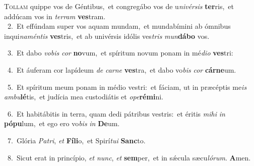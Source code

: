 \lettrine{\initial\textcolor{\initialcolor}{T}}{ollam} quippe vos de Géntibus,~\dagger et congregábo vos de u\-\textit{ni}\-\textit{vér}\textit{sis} \textbf{ter}\-ris,~\star et addúcam vos in \textit{ter}\-\textit{ram} \textbf{ves}\-tram.\\
{\numbfont\textcolor{\numbcolor}{~2.}}~Et effúndam super vos aquam mundam,~\dagger et mundabímini ab ómnibus inqui\-\textit{na}\-\textit{mén}\textit{tis} \textbf{ves}\-tris,~\star et ab univérsis idólis ves\textit{tris} \textit{mun}\-\textbf{dá}\textbf{bo} vos.\par
{\numbfont\textcolor{\numbcolor}{~3.}}~Et dabo \textit{vo}\-\textit{bis} \textit{cor} \textbf{no}\-vum,~\star et spíritum novum ponam in mé\-\textit{di}\-\textit{o} \textbf{ves}\-tri:\par
{\numbfont\textcolor{\numbcolor}{~4.}}~Et áuferam cor lapídeum \textit{de} \textit{car}\-\textit{ne} \textbf{ves}\-tra,~\star et dabo vo\textit{bis} \textit{cor} \textbf{cár}\-\textbf{ne}um.\par
{\numbfont\textcolor{\numbcolor}{~5.}}~Et spíritum meum ponam in médio vestri:~\dagger et fáciam, ut in præcéptis me\textit{is} \textit{am}\-\textit{bu}\textbf{lé}tis,~\star et judícia mea custodiátis et \textit{o}\-\textit{pe}\textbf{ré}\textbf{mi}ni.\par
{\numbfont\textcolor{\numbcolor}{~6.}}~Et habitábitis in terra, quam dedi pátribus vestris:~\dagger et éritis \textit{mi}\-\textit{hi} \textit{in} \textbf{pó}\-\textbf{pu}lum,~\star et ego ero vo\textit{bis} \textit{in} \textbf{De}\-um.\par
{\numbfont\textcolor{\numbcolor}{~7.}}~Glória \textit{Pa}\-\textit{tri}, \textit{et} \textbf{Fí}\-\textbf{li}o,~\star et Spirí\-\textit{tu}\-\textit{i} \textbf{Sanc}\-to.\par
{\numbfont\textcolor{\numbcolor}{~8.}}~Sicut erat in princípio, \textit{et} \textit{nunc}\-, \textit{et} \textbf{sem}\-per,~\star et in sǽcula sæcu\-\textit{ló}\-\textit{rum}. \textbf{A}\-men.\par
